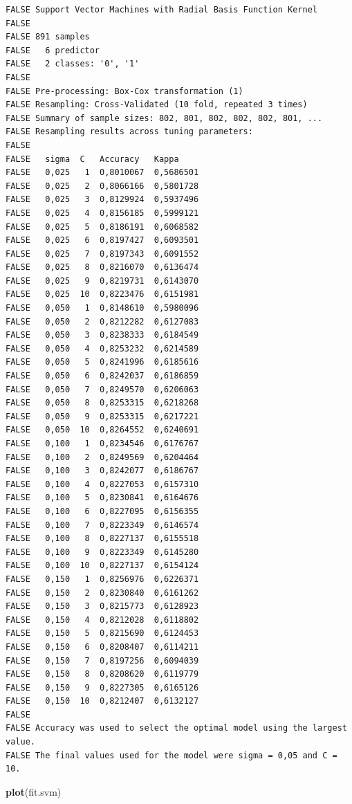 \documentclass[]{article}
\newenvironment{Shaded}{\begin{snugshade}}{\end{snugshade}}
\newcommand{\KeywordTok}[1]{\textcolor[rgb]{0.13,0.29,0.53}{\textbf{#1}}}
\newcommand{\NormalTok}[1]{#1}
\begin{document}
\begin{verbatim}
FALSE Support Vector Machines with Radial Basis Function Kernel 
FALSE 
FALSE 891 samples
FALSE   6 predictor
FALSE   2 classes: '0', '1' 
FALSE 
FALSE Pre-processing: Box-Cox transformation (1) 
FALSE Resampling: Cross-Validated (10 fold, repeated 3 times) 
FALSE Summary of sample sizes: 802, 801, 802, 802, 802, 801, ... 
FALSE Resampling results across tuning parameters:
FALSE 
FALSE   sigma  C   Accuracy   Kappa    
FALSE   0,025   1  0,8010067  0,5686501
FALSE   0,025   2  0,8066166  0,5801728
FALSE   0,025   3  0,8129924  0,5937496
FALSE   0,025   4  0,8156185  0,5999121
FALSE   0,025   5  0,8186191  0,6068582
FALSE   0,025   6  0,8197427  0,6093501
FALSE   0,025   7  0,8197343  0,6091552
FALSE   0,025   8  0,8216070  0,6136474
FALSE   0,025   9  0,8219731  0,6143070
FALSE   0,025  10  0,8223476  0,6151981
FALSE   0,050   1  0,8148610  0,5980096
FALSE   0,050   2  0,8212282  0,6127083
FALSE   0,050   3  0,8238333  0,6184549
FALSE   0,050   4  0,8253232  0,6214589
FALSE   0,050   5  0,8241996  0,6185616
FALSE   0,050   6  0,8242037  0,6186859
FALSE   0,050   7  0,8249570  0,6206063
FALSE   0,050   8  0,8253315  0,6218268
FALSE   0,050   9  0,8253315  0,6217221
FALSE   0,050  10  0,8264552  0,6240691
FALSE   0,100   1  0,8234546  0,6176767
FALSE   0,100   2  0,8249569  0,6204464
FALSE   0,100   3  0,8242077  0,6186767
FALSE   0,100   4  0,8227053  0,6157310
FALSE   0,100   5  0,8230841  0,6164676
FALSE   0,100   6  0,8227095  0,6156355
FALSE   0,100   7  0,8223349  0,6146574
FALSE   0,100   8  0,8227137  0,6155518
FALSE   0,100   9  0,8223349  0,6145280
FALSE   0,100  10  0,8227137  0,6154124
FALSE   0,150   1  0,8256976  0,6226371
FALSE   0,150   2  0,8230840  0,6161262
FALSE   0,150   3  0,8215773  0,6128923
FALSE   0,150   4  0,8212028  0,6118802
FALSE   0,150   5  0,8215690  0,6124453
FALSE   0,150   6  0,8208407  0,6114211
FALSE   0,150   7  0,8197256  0,6094039
FALSE   0,150   8  0,8208620  0,6119779
FALSE   0,150   9  0,8227305  0,6165126
FALSE   0,150  10  0,8212407  0,6132127
FALSE 
FALSE Accuracy was used to select the optimal model using the largest value.
FALSE The final values used for the model were sigma = 0,05 and C = 10.
\end{verbatim}

\begin{Shaded}
\begin{Highlighting}[]
\KeywordTok{plot}\NormalTok{(fit.svm)}
\end{Highlighting}
\end{Shaded}
\end{document}
